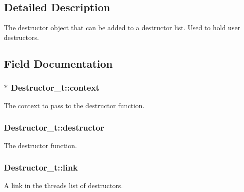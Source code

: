 \subsection{Detailed Description}
The destructor object that can be added to a destructor list. Used to hold user destructors. 

\subsection{Field Documentation}
\subsubsection[{\texorpdfstring{context}{context}}]{$\ast$ Destructor\+\_\+t\+::context}\hypertarget{struct_destructor__t_a95910cc77fb897555b31a181ec071d7f}{}\label{struct_destructor__t_a95910cc77fb897555b31a181ec071d7f}


The context to pass to the destructor function. 

\subsubsection[{\texorpdfstring{destructor}{destructor}}]{ Destructor\+\_\+t\+::destructor}\hypertarget{struct_destructor__t_ac7088d79a06b59e163548b55b954e40b}{}\label{struct_destructor__t_ac7088d79a06b59e163548b55b954e40b}


The destructor function. 

\subsubsection[{\texorpdfstring{link}{link}}]{ Destructor\+\_\+t\+::link}\hypertarget{struct_destructor__t_a9070a237487fb12ad197dfa45d49d4ac}{}\label{struct_destructor__t_a9070a237487fb12ad197dfa45d49d4ac}


A link in the thread\textquotesingle{}s list of destructors. 


